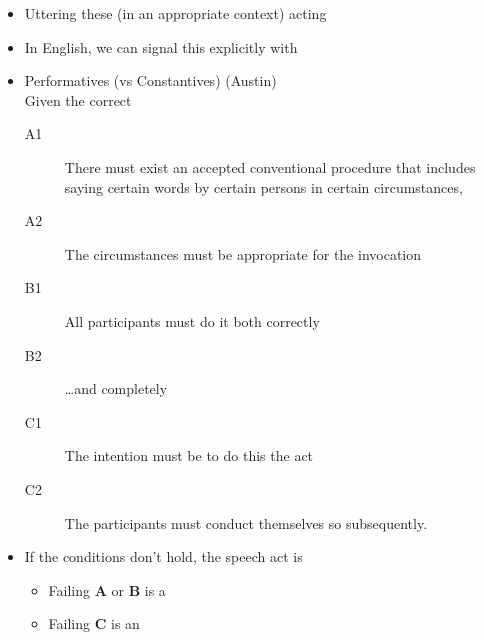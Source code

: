 \documentclass[headrule,footrule]{foils}
\begin{document}
\begin{itemize}
\item Uttering these (in an appropriate context)  acting
\\  
\item In English, we can signal this explicitly with 
\end{itemize}

\begin{itemize}
\item Performatives (vs Constantives) \hfill (Austin)
\\ Given the correct 
  \begin{description}
  \item[A1] There must exist an accepted conventional procedure that
    includes saying certain words by certain persons in certain
    circumstances,
  \item[A2] The circumstances must be appropriate for the invocation
  \item[B1] All participants must do it both correctly
  \item[B2] \ldots  and completely
  \item[C1] The intention must be to do this the act
  \item[C2] The participants must conduct themselves so subsequently.
  \end{description}
\item If the conditions don't hold, the speech act is 
  \begin{itemize}
  \item Failing \textbf{A} or \textbf{B} is a 
  \item Failing \textbf{C} is an 
  \end{itemize}
  \end{itemize}
\end{document}
